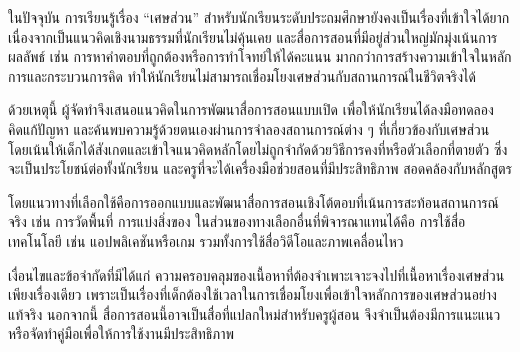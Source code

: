 \maketitle
\makesignature

\ifproject
\begin{abstractTH}
ในปัจจุบัน การเรียนรู้เรื่อง “เศษส่วน” สำหรับนักเรียนระดับประถมศึกษายังคงเป็นเรื่องที่เข้าใจได้ยาก เนื่องจากเป็นแนวคิดเชิงนามธรรมที่นักเรียนไม่คุ้นเคย และสื่อการสอนที่มีอยู่ส่วนใหญ่มักมุ่งเน้นการผลลัพธ์ เช่น การหาคำตอบที่ถูกต้องหรือการทำโจทย์ให้ได้คะแนน มากกว่าการสร้างความเข้าใจในหลักการและกระบวนการคิด ทำให้นักเรียนไม่สามารถเชื่อมโยงเศษส่วนกับสถานการณ์ในชีวิตจริงได้

ด้วยเหตุนี้ ผู้จัดทำจึงเสนอแนวคิดในการพัฒนาสื่อการสอนแบบเปิด เพื่อให้นักเรียนได้ลงมือทดลอง คิดแก้ปัญหา และค้นพบความรู้ด้วยตนเองผ่านการจำลองสถานการณ์ต่าง ๆ ที่เกี่ยวข้องกับเศษส่วน โดยเน้นให้เด็กได้สังเกตและเข้าใจแนวคิดหลักโดยไม่ถูกจำกัดด้วยวิธีการคงที่หรือตัวเลือกที่ตายตัว ซึ่งจะเป็นประโยชน์ต่อทั้งนักเรียน และครูที่จะได้เครื่องมือช่วยสอนที่มีประสิทธิภาพ สอดคล้องกับหลักสูตร

โดยแนวทางที่เลือกใช้คือการออกแบบและพัฒนาสื่อการสอนเชิงโต้ตอบที่เน้นการสะท้อนสถานการณ์จริง เช่น การวัดพื้นที่ การแบ่งสิ่งของ ในส่วนของทางเลือกอื่นที่พิจารณาแทนได้คือ การใช้สื่อเทคโนโลยี เช่น แอปพลิเคชันหรือเกม รวมทั้งการใช้สื่อวิดีโอและภาพเคลื่อนไหว

เงื่อนไขและข้อจำกัดที่มีได้แก่ ความครอบคลุมของเนื้อหาที่ต้องจำเพาะเจาะจงไปที่เนื้อหาเรื่องเศษส่วนเพียงเรื่องเดียว เพราะเป็นเรื่องที่เด็กต้องใช้เวลาในการเชื่อมโยงเพื่อเข้าใจหลักการของเศษส่วนอย่างแท้จริง นอกจากนี้ สื่อการสอนนี้อาจเป็นสื่อที่แปลกใหม่สำหรับครูผู้สอน จึงจำเป็นต้องมีการแนะแนวหรือจัดทำคู่มือเพื่อให้การใช้งานมีประสิทธิภาพ
\end{abstractTH}

